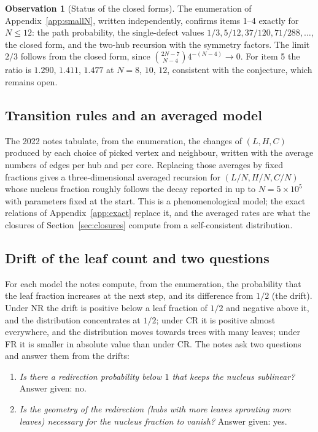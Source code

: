 \documentclass[11pt]{article}
\theoremstyle{plain}
\theoremstyle{definition}
\newtheorem{observation}[theorem]{Observation}
\theoremstyle{remark}
\begin{document}
\begin{observation}[Status of the closed forms]
The enumeration of Appendix~\ref{app:smallN}, written independently, confirms items 1--4 exactly for $N\le12$: the path probability, the single-defect values $1/3,5/12,37/120,71/288,\dots$, the closed form, and the two-hub recursion with the symmetry factors. The limit $2/3$ follows from the closed form, since $\binom{2N-7}{N-4}4^{-(N-4)}\to0$. For item 5 the ratio is $1.290$, $1.411$, $1.477$ at $N=8$, $10$, $12$, consistent with the conjecture, which remains open.
\end{observation}

\subsection*{Transition rules and an averaged model}
The 2022 notes tabulate, from the enumeration, the changes of $(L,H,C)$ produced by each choice of picked vertex and neighbour, written with the average numbers of edges per hub and per core. Replacing those averages by fixed fractions gives a three-dimensional averaged recursion for $(L/N,H/N,C/N)$ whose nucleus fraction roughly follows the decay reported in \cite{KR2017} up to $N=5\times10^5$ with parameters fixed at the start. This is a phenomenological model; the exact relations of Appendix~\ref{app:exact} replace it, and the averaged rates are what the closures of Section~\ref{sec:closures} compute from a self-consistent distribution.

\subsection*{Drift of the leaf count and two questions}
For each model the notes compute, from the enumeration, the probability that the leaf fraction increases at the next step, and its difference from $1/2$ (the drift). Under NR the drift is positive below a leaf fraction of $1/2$ and negative above it, and the distribution concentrates at $1/2$; under CR it is positive almost everywhere, and the distribution moves towards trees with many leaves; under FR it is smaller in absolute value than under CR. The notes ask two questions and answer them from the drifts:
\begin{enumerate}
\item \emph{Is there a redirection probability below $1$ that keeps the nucleus sublinear?} Answer given: no.
\item \emph{Is the geometry of the redirection (hubs with more leaves sprouting more leaves) necessary for the nucleus fraction to vanish?} Answer given: yes.
\end{enumerate}
\end{document}
